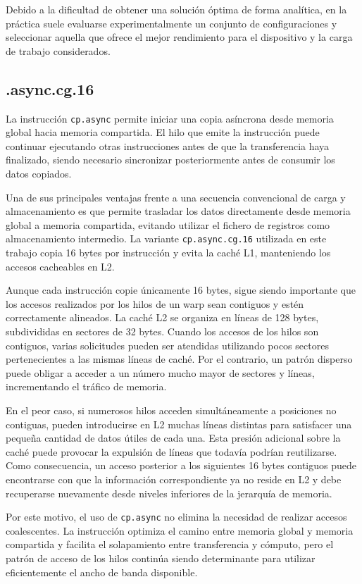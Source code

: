 Debido a la dificultad de obtener una solución óptima de forma analítica, en la práctica suele evaluarse experimentalmente un conjunto de configuraciones y seleccionar aquella que ofrece el mejor rendimiento para el dispositivo y la carga de trabajo considerados.

\subsection{\cp.async.cg.16}
La instrucción \texttt{cp.async} permite iniciar una copia asíncrona desde memoria global hacia memoria compartida. El hilo que emite la instrucción puede continuar ejecutando otras instrucciones antes de que la transferencia haya finalizado, siendo necesario sincronizar posteriormente antes de consumir los datos copiados.

Una de sus principales ventajas frente a una secuencia convencional de carga y almacenamiento es que permite trasladar los datos directamente desde memoria global a memoria compartida, evitando utilizar el fichero de registros como almacenamiento intermedio. La variante \texttt{cp.async.cg.16} utilizada en este trabajo copia 16 bytes por instrucción y evita la caché L1, manteniendo los accesos cacheables en L2.

Aunque cada instrucción copie únicamente 16 bytes, sigue siendo importante que los accesos realizados por los hilos de un warp sean contiguos y estén correctamente alineados. La caché L2 se organiza en líneas de 128 bytes, subdivididas en sectores de 32 bytes. Cuando los accesos de los hilos son contiguos, varias solicitudes pueden ser atendidas utilizando pocos sectores pertenecientes a las mismas líneas de caché. Por el contrario, un patrón disperso puede obligar a acceder a un número mucho mayor de sectores y líneas, incrementando el tráfico de memoria.

En el peor caso, si numerosos hilos acceden simultáneamente a posiciones no contiguas, pueden introducirse en L2 muchas líneas distintas para satisfacer una pequeña cantidad de datos útiles de cada una. Esta presión adicional sobre la caché puede provocar la expulsión de líneas que todavía podrían reutilizarse. Como consecuencia, un acceso posterior a los siguientes 16 bytes contiguos puede encontrarse con que la información correspondiente ya no reside en L2 y debe recuperarse nuevamente desde niveles inferiores de la jerarquía de memoria.

Por este motivo, el uso de \texttt{cp.async} no elimina la necesidad de realizar accesos coalescentes. La instrucción optimiza el camino entre memoria global y memoria compartida y facilita el solapamiento entre transferencia y cómputo, pero el patrón de acceso de los hilos continúa siendo determinante para utilizar eficientemente el ancho de banda disponible.

